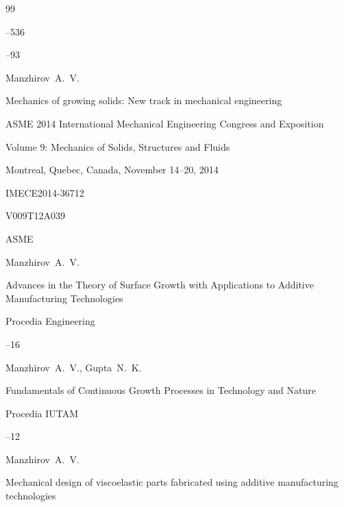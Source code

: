 \begin{thebibliography}{99}

--536

--93





\by Manzhirov~A.~V.

\paper Mechanics of growing solids: New track in mechanical engineering

\inbook ASME 2014 International Mechanical Engineering Congress and Exposition

\bookinfo Volume 9: Mechanics of Solids, Structures and Fluids

\procinfo Montreal, Quebec, Canada, November 14–20, 2014


\papernumber IMECE2014-36712

\pages V009T12A039


\publaddr ASME




\by Manzhirov~A.~V.

\paper Advances in the Theory of Surface Growth with Applications to Additive Manufacturing Technologies

\jour Procedia Engineering



--16





\by Manzhirov~A.~V., Gupta~N.~K.

\paper Fundamentals of Continuous Growth Processes in Technology and Nature

\jour Procedia IUTAM



--12







\by Manzhirov~A.~V.

\paper Mechanical design of viscoelastic parts fabricated using additive manufacturing technologies


\end{thebibliography}
